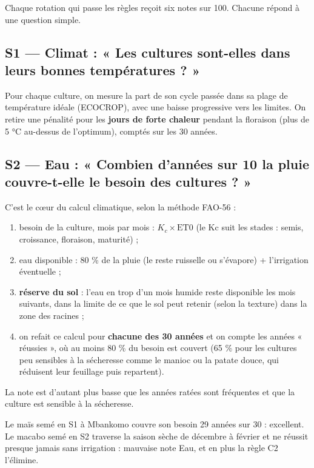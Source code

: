 \documentclass[11pt,a4paper]{article}
\begin{document}
Chaque rotation qui passe les règles reçoit six notes sur 100. Chacune répond à une question simple.

\subsection*{S1 — Climat : « Les cultures sont-elles dans leurs bonnes températures ? »}
Pour chaque culture, on mesure la part de son cycle passée dans sa plage de température idéale (ECOCROP), avec une
baisse progressive vers les limites. On retire une pénalité pour les \textbf{jours de forte chaleur} pendant la
floraison (plus de 5 °C au-dessus de l'optimum), comptés sur les 30 années.

\subsection*{S2 — Eau : « Combien d'années sur 10 la pluie couvre-t-elle le besoin des cultures ? »}
C'est le cœur du calcul climatique, selon la méthode FAO-56 :
\begin{enumerate}
\item besoin de la culture, mois par mois : \(K_c \times \text{ET0}\) (le Kc suit les stades : semis, croissance, floraison, maturité) ;
\item eau disponible : 80 \% de la pluie (le reste ruisselle ou s'évapore) + l'irrigation éventuelle ;
\item \textbf{réserve du sol} : l'eau en trop d'un mois humide reste disponible les mois suivants, dans la limite de
ce que le sol peut retenir (selon la texture) dans la zone des racines ;
\item on refait ce calcul pour \textbf{chacune des 30 années} et on compte les années « réussies », où au moins
80 \% du besoin est couvert (65 \% pour les cultures peu sensibles à la sécheresse comme le manioc ou la patate
douce, qui réduisent leur feuillage puis repartent).
\end{enumerate}
La note est d'autant plus basse que les années ratées sont fréquentes et que la culture est sensible à la sécheresse.

\begin{exemple}[Exemple]
Le maïs semé en S1 à Mbankomo couvre son besoin 29 années sur 30 : excellent. Le macabo semé en S2 traverse la
saison sèche de décembre à février et ne réussit presque jamais sans irrigation : mauvaise note Eau, et en plus la
règle C2 l'élimine.
\end{exemple}
\end{document}
